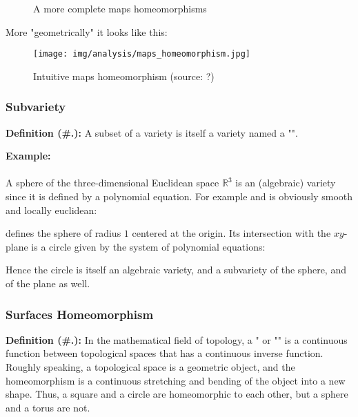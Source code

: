 \begin{figure}[H]
		\vspace*{3mm}
		\caption{A more complete maps homeomorphisms}
	\end{figure}
	More "geometrically" it looks like this:
	\begin{figure}[H]
		\centering
		\texttt{[image: img/analysis/maps\_homeomorphism.jpg]}
		\vspace*{3mm}
		\caption[Intuitive maps homeomorphism]{Intuitive maps homeomorphism (source: ?)}
	\end{figure}

	\subsubsection{Subvariety}
	\textbf{Definition (\#\thesection.\mydef):} A subset of a variety is itself a variety named a "\label{subvariety}". 

	\begin{tcolorbox}[colframe=black,colback=white,sharp corners]
	\textbf{{\Large {}}Example:}\\\\
	A sphere of the three-dimensional Euclidean space $\mathbb{R}^3$ is an (algebraic) variety since it is defined by a polynomial equation. For example and is obviously smooth and locally euclidean:
	
	defines the sphere of radius $1$ centered at the origin. Its intersection with the $xy$-plane is a circle given by the system of polynomial equations:
	
	Hence the circle is itself an algebraic variety, and a subvariety of the sphere, and of the plane as well.
	\end{tcolorbox}
	

	\pagebreak
	\subsubsection{Surfaces Homeomorphism}
	\textbf{Definition (\#\thesection.\mydef):} In the mathematical field of topology, a " or "" is a continuous function between topological spaces that has a continuous inverse function. Roughly speaking, a topological space is a geometric object, and the homeomorphism is a continuous stretching and bending of the object into a new shape. Thus, a square and a circle are homeomorphic to each other, but a sphere and a torus are not. 
	
